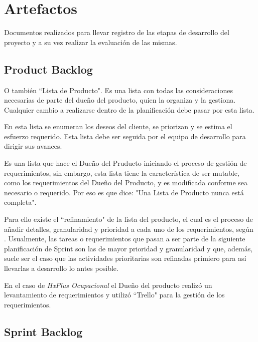     \section{Artefactos}
    
    Documentos realizados para llevar registro de las etapas de desarrollo del proyecto y a su vez realizar la evaluación de las mismas.
    
        \subsection{Product Backlog}
        
        O también ``Lista de Producto". Es una lista con todas las consideraciones necesarias de parte del dueño del producto, quien la organiza y la gestiona. Cualquier cambio a realizarse dentro de la planificación debe pasar por esta lista.
        
        En esta lista se enumeran los deseos del cliente, se priorizan y se estima el esfuerzo requerido. Esta lista debe ser seguida por el equipo de desarrollo para dirigir sus avances.
        
        Es una lista que hace el Dueño del Pruducto iniciando el proceso de gestión de requerimientos, sin embargo, esta lista tiene la característica de ser mutable, como los requerimientos del Dueño del Producto, y es modificada conforme sea necesario o requerido. Por eso es que \citeauthor{scrum-guia}\cite{scrum-guia} dice: "Una Lista de Producto nunca está completa".
        
        Para ello existe el ``refinamiento" de la lista del  producto, el cual  es el proceso de añadir detalles, granularidad y prioridad a cada uno de los requerimientos, según \citeauthor{scrum-guia}\cite{scrum-guia}. Usualmente, las tareas o requerimientos que pasan a ser parte de la siguiente planificación de Sprint son las de mayor prioridad y granularidad y que, además, suele ser el caso que las actividades prioritarias son refinadas primiero para así llevarlas a desarrollo lo antes posible.
        
        En el caso de \textit{HxPlus Ocupacional} el Dueño del producto realizó un levantamiento de requerimientos y utilizó ``Trello" para la gestión de los requerimientos.
    
        \subsection{Sprint Backlog}
        
